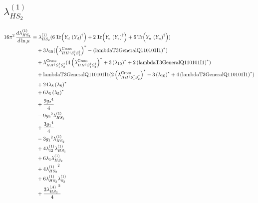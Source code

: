 \documentclass[10pt,a4paper]{article}
\begin{document}
\subsection*{$\lambda_{HS_2}^{(1)}$}
\begin{align*}
16\pi^2\,\frac{d \lambda_{HS_2}^{(1)}}{d\ln\mu} &={\lambda_{HS_2}^{(1)}} (6 \operatorname{Tr}\!\left({Y_d}\,\left({Y_d}\right)^{\dagger}\right)+2 \operatorname{Tr}\!\left({Y_e}\,\left({Y_e}\right)^{\dagger}\right)+6 \operatorname{Tr}\!\left({Y_u}\,\left({Y_u}\right)^{\dagger}\right)) \\
&\quad +3 {\lambda_{10}} (\left({\lambda_{H H^\dagger S_1^\dagger S_2^\dagger}^{\rm Cross}}\right)^{*}-\left(\text{lambdaT3GeneralQ110101I1}\right)^{*}) \\
&\quad +{\lambda_{H H^\dagger S_1^\dagger S_2^\dagger}^{\rm Cross}} (4 \left({\lambda_{H H^\dagger S_1^\dagger S_2^\dagger}^{\rm Cross}}\right)^{*}+3 \left({\lambda_{10}}\right)^{*}+2 \left(\text{lambdaT3GeneralQ110101I1}\right)^{*}) \\
&\quad +\text{lambdaT3GeneralQ110101I1} (2 \left({\lambda_{H H^\dagger S_1^\dagger S_2^\dagger}^{\rm Cross}}\right)^{*}-3 \left({\lambda_{10}}\right)^{*}+4 \left(\text{lambdaT3GeneralQ110101I1}\right)^{*}) \\
&\quad +24 {\lambda_{8}} \left({\lambda_{8}}\right)^{*} \\
&\quad +6 {\lambda_5} \left({\lambda_5}\right)^{*} \\
&\quad +\frac{9 {g_2}^4}{4} \\
&\quad -9 {g_2}^2 {\lambda_{HS_2}^{(1)}} \\
&\quad +\frac{3 {g_1}^4}{4} \\
&\quad -3 {g_1}^2 {\lambda_{HS_2}^{(1)}} \\
&\quad +4 {\lambda_{12}^{(1)}} {\lambda_{HS_1}^{(1)}} \\
&\quad +6 {\lambda_1} {\lambda_{HS_2}^{(1)}} \\
&\quad +4 {\lambda_{HS_2}^{(1)}}^2 \\
&\quad +6 {\lambda_{HS_2}^{(1)}} {\lambda_{S_2}^{(1)}} \\
&\quad +\frac{3 {\lambda_{HS_2}^{(A)}}^2}{4} \\
\end{align*}
\end{document}
